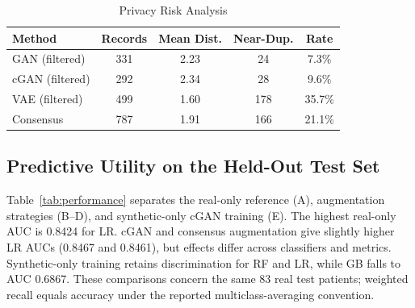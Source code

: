 \documentclass[journal]{IEEEtran}
\begin{document}
\begin{table}[!tb]
  \centering
  \caption{Privacy Risk Analysis}
  \label{tab:privacy}
  \begin{tabular}{lcccc}
    \toprule
    Method & Records & Mean Dist. & Near-Dup. & Rate \\
    \midrule
    GAN (filtered)   & 331 & 2.23 & 24  & 7.3\%  \\
    cGAN (filtered) & 292 & 2.34 & 28  & 9.6\%  \\
    VAE (filtered)  & 499 & 1.60 & 178 & 35.7\% \\
    Consensus        & 787 & 1.91 & 166 & 21.1\% \\
    \bottomrule
  \end{tabular}
\end{table}

\subsection{Predictive Utility on the Held-Out Test Set}

Table~\ref{tab:performance} separates the real-only reference (A), augmentation strategies (B--D), and synthetic-only cGAN training (E). The highest real-only AUC is 0.8424 for LR. cGAN and consensus augmentation give slightly higher LR AUCs (0.8467 and 0.8461), but effects differ across classifiers and metrics. Synthetic-only training retains discrimination for RF and LR, while GB falls to AUC 0.6867. These comparisons concern the same 83 real test patients; weighted recall equals accuracy under the reported multiclass-averaging convention.
\end{document}
